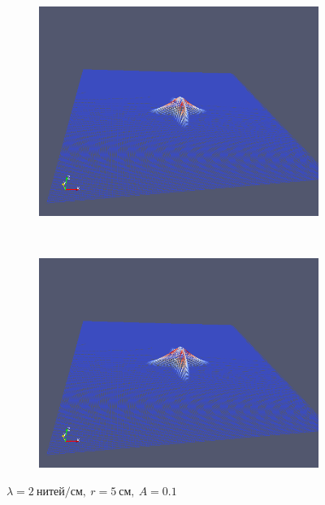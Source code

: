 \begin{figure}[H]
\begin{subfigure}[t]{0.5\textwidth}
        \includegraphics[width=\textwidth]{img/fiber/density_2_radius_5_amplitude_0.1/5.png}
    \end{subfigure}%
    ~
    \begin{subfigure}[t]{0.5\textwidth}
        \centering
        \includegraphics[width=\textwidth]{img/fiber/density_2_radius_5_amplitude_0.1/6.png}
    \end{subfigure}
    \caption{$\lambda=2~нитей/см,~r=5~см,~A=0.1$}
\end{figure}

